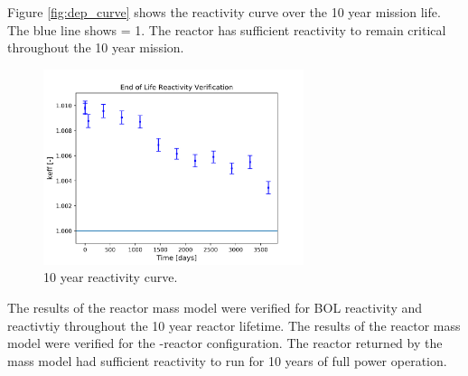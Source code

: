 Figure \ref{fig:dep_curve} shows the reactivity curve over the 10 year mission
life. The blue line shows \keff = 1. The reactor has sufficient reactivity to
remain critical throughout the 10 year mission.

\begin{figure}[h]
    \centering
    \includegraphics[width=3in]{../images/depletion_results.png}
\caption{10 year reactivity curve.}
\label{fig:depl_curve}
\end{figure}

The results of the reactor mass model were verified for BOL reactivity and
reactivtiy throughout the 10 year reactor lifetime. The results of the reactor
mass model were verified for the \uox-\codiox reactor configuration. The reactor
returned by the mass model had sufficient reactivity to run for 10 years of full
power operation.
